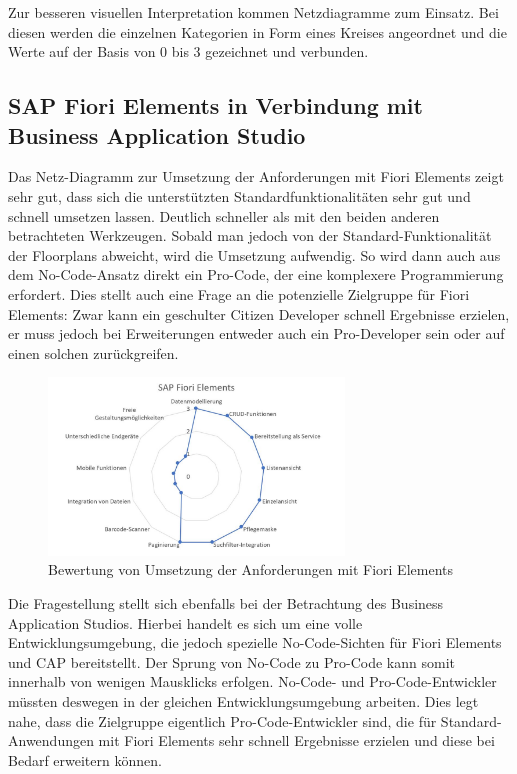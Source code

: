 Zur besseren visuellen Interpretation kommen Netzdiagramme zum Einsatz. Bei diesen werden die einzelnen Kategorien in Form eines Kreises angeordnet und die Werte auf der Basis von 0 bis 3 gezeichnet und verbunden.

\subsection{SAP Fiori Elements in Verbindung mit Business Application Studio}
Das Netz-Diagramm zur Umsetzung der Anforderungen mit Fiori Elements zeigt sehr gut, dass sich die unterstützten Standardfunktionalitäten sehr gut und schnell umsetzen lassen. Deutlich schneller als mit den beiden anderen betrachteten Werkzeugen. Sobald man jedoch von der Standard-Funktionalität der Floorplans abweicht, wird die Umsetzung aufwendig.
So wird dann auch aus dem No-Code-Ansatz direkt ein Pro-Code, der eine komplexere Programmierung erfordert. Dies stellt auch eine Frage an die potenzielle Zielgruppe für Fiori Elements: Zwar kann ein geschulter Citizen Developer schnell Ergebnisse erzielen, er muss jedoch bei Erweiterungen entweder auch ein Pro-Developer sein oder auf einen solchen zurückgreifen.
\begin{figure}[!htbp]
 \centering
 \includegraphics[width=0.7\textwidth]{Bilder/bewertung/ND_fiori.jpg}
 \caption{Bewertung von Umsetzung der Anforderungen mit Fiori Elements}
\end{figure}

\pagebreak
Die Fragestellung stellt sich ebenfalls bei der Betrachtung des Business Application Studios. Hierbei handelt es sich um eine volle Entwicklungsumgebung, die jedoch spezielle No-Code-Sichten für Fiori Elements und CAP bereitstellt. Der Sprung von No-Code zu Pro-Code kann somit innerhalb von wenigen Mausklicks erfolgen. No-Code- und Pro-Code-Entwickler müssten deswegen in der gleichen Entwicklungsumgebung arbeiten. Dies legt nahe, dass die Zielgruppe eigentlich Pro-Code-Entwickler sind, die für Standard-Anwendungen mit Fiori Elements sehr schnell Ergebnisse erzielen und diese bei Bedarf erweitern können.

